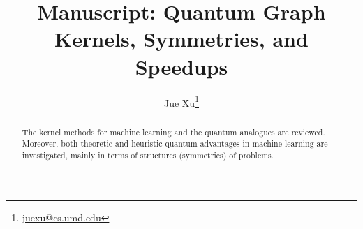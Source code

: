 \documentclass[11pt]{article}
\title{Manuscript: Quantum Graph Kernels, Symmetries, and Speedups}
\author{Jue Xu\footnote{\href{mailto:juexu@cs.umd.edu}{ juexu@cs.umd.edu}} }
\theoremstyle{plain}
\theoremstyle{definition}
\begin{document}
\maketitle
\begin{abstract}
	The kernel methods for machine learning and the quantum analogues are reviewed.
	Moreover, both theoretic and heuristic quantum advantages in machine learning are investigated, mainly in terms of structures (symmetries) of problems.
\end{abstract}

\setcounter{tocdepth}{2}
\tableofcontents


% 
% 
% 
% 
% 
% 
% 
% 





% 
% 
% 
% 
\end{document}
